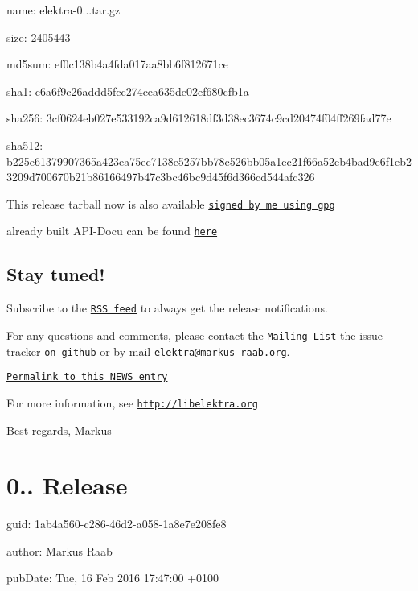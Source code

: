 \begin{DoxyItemize}
\item name\+: elektra-\/0...\+tar.\+gz
\item size\+: 2405443
\item md5sum\+: ef0c138b4a4fda017aa8bb6f812671ce
\item sha1\+: c6a6f9c26addd5fcc274cea635de02ef680cfb1a
\item sha256\+: 3cf0624eb027e533192ca9d612618df3d38ec3674c9cd20474f04ff269fad77e
\item sha512\+: b225e61379907365a423ea75ec7138e5257bb78c526bb05a1ec21f66a52eb4bad9e6f1eb23209d700670b21b86166497b47c3bc46bc9d45f6d366cd544afc326
\end{DoxyItemize}

This release tarball now is also available \href{http://www.libelektra.org/ftp/elektra/releases/elektra-0.8.16.tar.gz.gpg}{\tt signed by me using gpg}

already built A\+P\+I-\/\+Docu can be found \href{http://doc.libelektra.org/api/0.8.16/html/}{\tt here}

\subsection*{Stay tuned!}

Subscribe to the \href{http://doc.libelektra.org/news/feed.rss}{\tt R\+S\+S feed} to always get the release notifications.

For any questions and comments, please contact the \href{https://lists.sourceforge.net/lists/listinfo/registry-list}{\tt Mailing List} the issue tracker \href{http://git.libelektra.org/issues}{\tt on github} or by mail \href{mailto:elektra@markus-raab.org}{\tt elektra@markus-\/raab.\+org}.

\href{http://doc.libelektra.org/news/9c9247ee-ee9c-4f4a-a68e-76959def9b82.html}{\tt Permalink to this N\+E\+W\+S entry}

For more information, see \href{http://libelektra.org}{\tt http\+://libelektra.\+org}

Best regards, Markus

\section*{0.. Release}


\begin{DoxyItemize}
\item guid\+: 1ab4a560-\/c286-\/46d2-\/a058-\/1a8e7e208fe8
\item author\+: Markus Raab
\item pub\+Date\+: Tue, 16 Feb 2016 17\+:47\+:00 +0100
\end{DoxyItemize}

